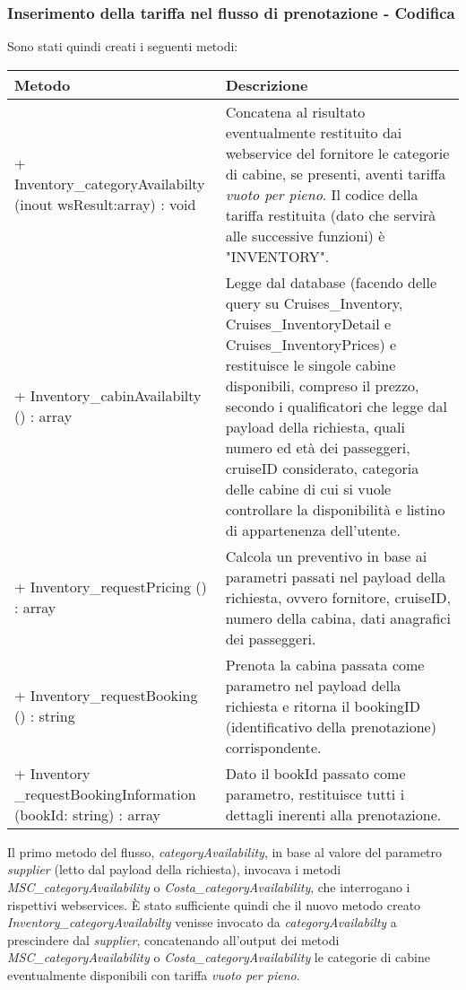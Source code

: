 \subsubsection{Inserimento della tariffa nel flusso di prenotazione - Codifica}
Sono stati quindi creati i seguenti metodi:
\begin{center}
	\def\arraystretch{1.5}
	\begin{longtable}{ >{\raggedright}p{5.5cm} p{6.8cm}} 
		\hline
		\textbf{Metodo} & \textbf{Descrizione} \\ \hline
		+ Inventory\_categoryAvailabilty (inout wsResult:array) : void & Concatena al risultato eventualmente restituito dai \gls{webservice} del fornitore le categorie di cabine, se presenti, aventi tariffa \textit{vuoto per pieno}. Il codice della tariffa restituita (dato che servirà alle successive funzioni) è "INVENTORY".\\
		\hline
		+ Inventory\_cabinAvailabilty () : array & Legge dal database (facendo delle query su Cruises\_Inventory, Cruises\_InventoryDetail e Cruises\_InventoryPrices) e restituisce le singole cabine disponibili, compreso il prezzo, secondo i qualificatori che legge dal payload della richiesta, quali numero ed età dei passeggeri, cruiseID considerato, categoria delle cabine di cui si vuole controllare la disponibilità e listino di appartenenza dell'utente.\\
		\hline
		+ Inventory\_requestPricing () : array & Calcola un preventivo in base ai parametri passati nel payload della richiesta, ovvero fornitore, cruiseID, numero della cabina, dati anagrafici dei passeggeri.\\
		\hline
		+ Inventory\_requestBooking () : string & Prenota la cabina passata come parametro nel payload della richiesta e ritorna il bookingID (identificativo della prenotazione) corrispondente.\\
		\hline
		+ Inventory \_requestBookingInformation (bookId: string) : array & Dato il bookId passato come parametro, restituisce tutti i dettagli inerenti alla prenotazione. \\
		\hline
	\end{longtable}
\end{center}
Il primo metodo del flusso, \textit{categoryAvailability}, in base al valore del parametro \textit{supplier} (letto dal payload della richiesta), invocava i metodi \textit{MSC\_categoryAvailability} o \textit{Costa\_categoryAvailability}, che interrogano i rispettivi \glspl{webservice}. È stato sufficiente quindi che il nuovo metodo creato \textit{Inventory\_categoryAvailabilty} venisse invocato da \textit{categoryAvailabilty} a prescindere dal \textit{supplier}, concatenando all'output dei metodi \textit{MSC\_categoryAvailability} o \textit{Costa\_categoryAvailability} le categorie di cabine eventualmente disponibili con tariffa \textit{vuoto per pieno}.\\
